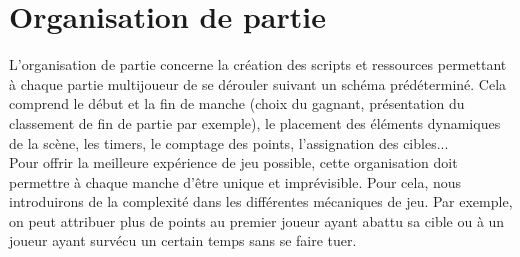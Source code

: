 \documentclass[../doc.tex]{subfiles}
\begin{document}
\section{Organisation de partie}
L'organisation de partie concerne la création des scripts
et ressources permettant à chaque partie multijoueur de se dérouler suivant un schéma prédéterminé. Cela comprend le début et 
la fin de manche (choix du gagnant, présentation du classement
de fin de partie par exemple), le placement des éléments dynamiques de la scène,
les timers, le comptage des points, l'assignation des cibles...
\\

\indent
Pour offrir la meilleure expérience de jeu possible, cette organisation
doit permettre à chaque manche d'être unique et imprévisible.
Pour cela, nous introduirons de la complexité dans les différentes
mécaniques de jeu. Par exemple, on peut attribuer plus de points
au premier joueur ayant abattu sa cible ou à un joueur ayant
survécu un certain temps sans se faire tuer.
\end{document}
